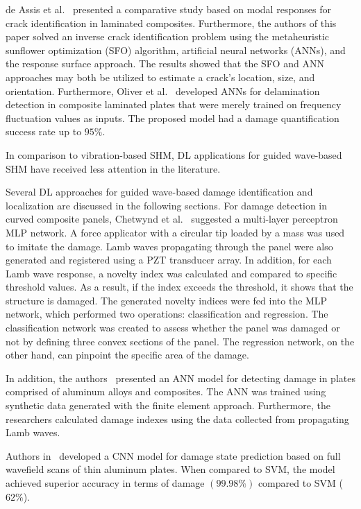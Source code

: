 de Assis et al.~\cite{DeAssis2021} presented a comparative study based on modal responses for crack identification in laminated composites.
Furthermore, the authors of this paper solved an inverse crack identification problem using the metaheuristic sunflower optimization (SFO) algorithm, artificial neural networks (ANNs), and the response surface approach.
The results showed that the SFO and ANN approaches may both be utilized to estimate a crack's location, size, and orientation.
Furthermore, Oliver et al.~\cite{Oliver2021} developed ANNs for delamination detection in composite laminated plates that were merely trained on frequency fluctuation values as inputs.
The proposed model had a damage quantification success rate up to \(95\% \).

In comparison to vibration-based SHM, DL applications for guided wave-based SHM have received less attention in the literature.

Several DL approaches for guided wave-based damage identification and localization are discussed in the following sections.
For damage detection in curved composite panels, Chetwynd et al.~\cite{Chetwynd2008damage} suggested a multi-layer perceptron MLP network.
A force applicator with a circular tip loaded by a mass was used to imitate the damage.
Lamb waves propagating through the panel were also generated and registered using a PZT transducer array.
In addition, for each Lamb wave response, a novelty index was calculated and compared to specific threshold values.
As a result, if the index exceeds the threshold, it shows that the structure is damaged.
The generated novelty indices were fed into the MLP network, which performed two operations: classification and regression.
The classification network was created to assess whether the panel was damaged or not by defining three convex sections of the panel.
The regression network, on the other hand, can pinpoint the specific area of the damage.

In addition, the authors~\cite{DeFenza2015} presented an ANN model for detecting damage in plates comprised of aluminum alloys and composites.
The ANN was trained using synthetic data generated with the finite element approach.
Furthermore, the researchers calculated damage indexes using the data collected from propagating Lamb waves.

Authors in~\cite{Melville2018} developed a CNN model for damage state prediction based on full wavefield scans of thin aluminum plates.
When compared to SVM, the model achieved superior accuracy in terms of damage $(99.98\%)$ compared to SVM ($62\%$).


